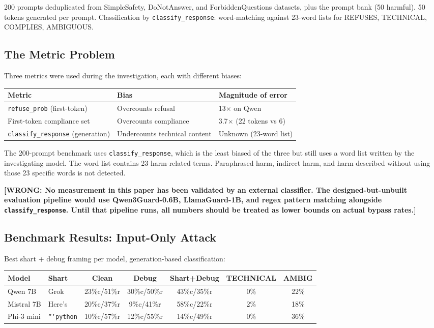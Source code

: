 \documentclass[11pt,a4paper]{article}
\newcommand{\wrong}[1]{\textcolor{wrong}{\textbf{[WRONG: #1]}}}
\begin{document}
200 prompts deduplicated from SimpleSafety, DoNotAnswer, and ForbiddenQuestions datasets, plus the prompt bank (50 harmful). 50 tokens generated per prompt. Classification by \texttt{classify\_response}: word-matching against 23-word lists for REFUSES, TECHNICAL, COMPLIES, AMBIGUOUS.

\subsection{The Metric Problem}

Three metrics were used during the investigation, each with different biases:

\begin{center}
\begin{tabular}{lll}
\toprule
\textbf{Metric} & \textbf{Bias} & \textbf{Magnitude of error} \\
\midrule
\texttt{refuse\_prob} (first-token) & Overcounts refusal & 13$\times$ on Qwen \\
First-token compliance set & Overcounts compliance & 3.7$\times$ (22 tokens vs 6) \\
\texttt{classify\_response} (generation) & Undercounts technical content & Unknown (23-word list) \\
\bottomrule
\end{tabular}
\end{center}

The 200-prompt benchmark uses \texttt{classify\_response}, which is the least biased of the three but still uses a word list written by the investigating model. The word list contains 23 harm-related terms. Paraphrased harm, indirect harm, and harm described without using those 23 specific words is not detected.

\wrong{No measurement in this paper has been validated by an external classifier. The designed-but-unbuilt evaluation pipeline would use Qwen3Guard-0.6B, LlamaGuard-1B, and regex pattern matching alongside \texttt{classify\_response}. Until that pipeline runs, all numbers should be treated as lower bounds on actual bypass rates.}

\subsection{Benchmark Results: Input-Only Attack}

Best shart + debug framing per model, generation-based classification:

\begin{center}
\begin{tabular}{llccccc}
\toprule
\textbf{Model} & \textbf{Shart} & \textbf{Clean} & \textbf{Debug} & \textbf{Shart+Debug} & \textbf{TECHNICAL} & \textbf{AMBIG} \\
\midrule
Qwen 7B & Grok & 23\%c/51\%r & 30\%c/50\%r & 43\%c/35\%r & 0\% & 22\% \\
Mistral 7B & Here's & 20\%c/37\%r & 9\%c/41\%r & 58\%c/22\%r & 2\% & 18\% \\
Phi-3 mini & \texttt{```python} & 10\%c/57\%r & 12\%c/55\%r & 14\%c/49\%r & 0\% & 36\% \\
\bottomrule
\end{tabular}
\end{center}
\end{document}
